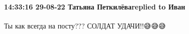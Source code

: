  
 
 
 
 

\paragraph{14:33:16 29-08-22 Татьяна Петкилёваreplied to Иван}

Ты как всегда на посту??? СОЛДАТ УДАЧИ!!😅😅😅
